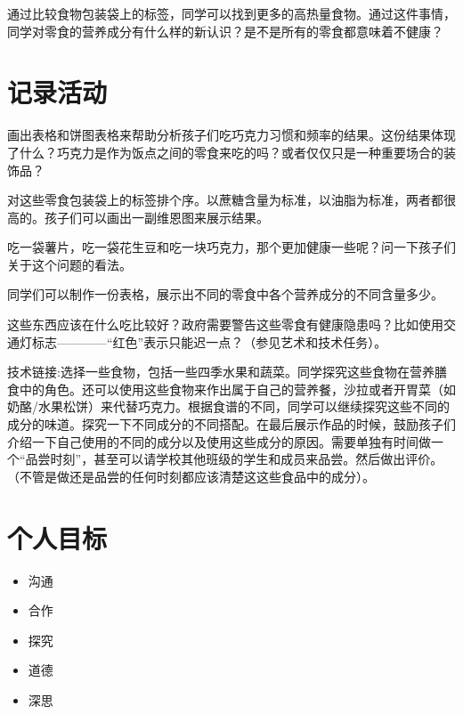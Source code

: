    通过比较食物包装袋上的标签，同学可以找到更多的高热量食物。通过这件事情，同学对零食的营养成分有什么样的新认识？是不是所有的零食都意味着不健康？
\section{记录活动}
    画出表格和饼图表格来帮助分析孩子们吃巧克力习惯和频率的结果。这份结果体现了什么？巧克力是作为饭点之间的零食来吃的吗？或者仅仅只是一种重要场合的装饰品？\par
    对这些零食包装袋上的标签排个序。以蔗糖含量为标准，以油脂为标准，两者都很高的。孩子们可以画出一副维恩图来展示结果。\par
    吃一袋薯片，吃一袋花生豆和吃一块巧克力，那个更加健康一些呢？问一下孩子们关于这个问题的看法。\par
    同学们可以制作一份表格，展示出不同的零食中各个营养成分的不同含量多少。\par
    这些东西应该在什么吃比较好？政府需要警告这些零食有健康隐患吗？比如使用交通灯标志————“红色”表示只能迟一点？（参见艺术和技术任务）。\par
    技术链接:选择一些食物，包括一些四季水果和蔬菜。同学探究这些食物在营养膳食中的角色。还可以使用这些食物来作出属于自己的营养餐，沙拉或者开胃菜（如奶酪/水果松饼）来代替巧克力。根据食谱的不同，同学可以继续探究这些不同的成分的味道。探究一下不同成分的不同搭配。在最后展示作品的时候，鼓励孩子们介绍一下自己使用的不同的成分以及使用这些成分的原因。需要单独有时间做一个“品尝时刻”，甚至可以请学校其他班级的学生和成员来品尝。然后做出评价。（不管是做还是品尝的任何时刻都应该清楚这这些食品中的成分）。



\section{个人目标}

  \begin{itemize}
    \item 沟通
    \item 合作
    \item 探究
    \item 道德 
    \item 深思
  \end{itemize}  

